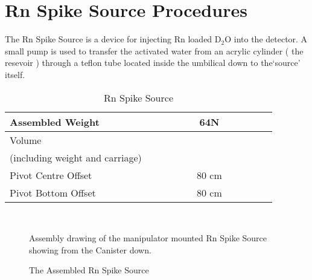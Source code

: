 

  
\section{Rn Spike Source Procedures}



  The Rn Spike Source is a device for injecting Rn loaded D$_2$O 
into the detector. A small pump is used to transfer the activated water from 
an acrylic cylinder ( the resevoir ) through a teflon tube located
inside the umbilical down to the`source' itself.




\begin{table}[htb]
\begin{center}
\begin{tabular}{|l|c|}
\hline
Assembled Weight & ~~~~~~~~ 64N ~~~~~~~~\\
\hline
Volume           & ~~~~~~~~~~~~~~~~~~~~~\\
(including weight and carriage) & \\
\hline
Pivot Centre Offset & 80 cm\\
\hline
Pivot Bottom Offset & 80 cm\\
\hline
\end{tabular}
\caption[Rn Spike Source]
  {Rn Spike Source
  }
\end{center}
\end{table}



\clearpage
\begin{figure}
\begin{center}
\epsfxsize=7in
~\\
\caption[Assembly drawing of the manipulator mounted Rn Spike Source]
        {Assembly drawing of the manipulator mounted Rn Spike Source 
         showing from the Canister down.
        } 
        
\end{center}
\end{figure}




\clearpage

\begin{figure}[t]
\begin{center}
\leavevmode
\epsfxsize=5.0in
\caption[Rn Spike Source Assembled]{
  }
  The Assembled Rn Spike Source
\end{center}
\end{figure}



